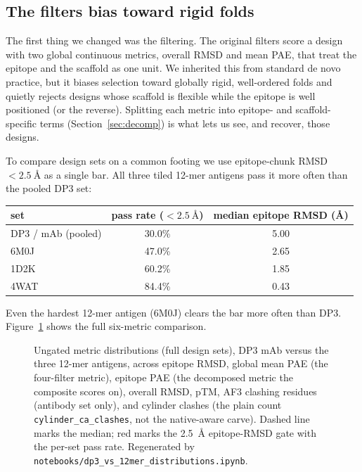 \subsection{The filters bias toward rigid folds}\label{sec:filtering}
The first thing we changed was the filtering. The original filters score a design with two
global continuous metrics, overall RMSD and mean PAE, that treat the epitope and the scaffold
as one unit. We inherited this from standard de novo practice, but it biases selection toward
globally rigid, well-ordered folds and quietly rejects designs whose scaffold is flexible while
the epitope is well positioned (or the reverse). Splitting each metric into epitope- and
scaffold-specific terms (Section~\ref{sec:decomp}) is what lets us see, and recover, those
designs.

To compare design sets on a common footing we use epitope-chunk RMSD $< \SI{2.5}{\angstrom}$
as a single bar. All three tiled 12-mer antigens pass it more often than the pooled DP3 set:

\begin{center}
\begin{tabular}{lcc}
\toprule
set & pass rate ($<\SI{2.5}{\angstrom}$) & median epitope RMSD (\si{\angstrom}) \\
\midrule
DP3 / mAb (pooled) & 30.0\% & 5.00 \\
6M0J               & 47.0\% & 2.65 \\
1D2K               & 60.2\% & 1.85 \\
4WAT               & 84.4\% & 0.43 \\
\bottomrule
\end{tabular}
\end{center}

\noindent
Even the hardest 12-mer antigen (6M0J) clears the bar more often than DP3. Figure~\ref{fig:passrates}
shows the full six-metric comparison.

\begin{figure}[h]\centering
{}
\caption{Ungated metric distributions (full design sets), DP3 mAb versus the three 12-mer
antigens, across epitope RMSD, global mean PAE (the four-filter metric), epitope PAE (the
decomposed metric the composite scores on), overall RMSD, pTM, AF3 clashing residues
(antibody set only), and cylinder clashes (the plain count \texttt{cylinder\_ca\_clashes}, not
the native-aware carve). Dashed line marks the median; red marks the
\SI{2.5}{\angstrom} epitope-RMSD gate with the per-set pass rate. Regenerated by
\texttt{notebooks/dp3\_vs\_12mer\_distributions.ipynb}.}
\label{fig:passrates}
\end{figure}

